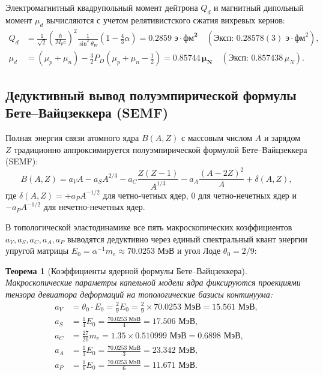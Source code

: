 \documentclass[11pt,a4paper]{article}
\newtheorem{theorem}{Теорема}[section]
\theoremstyle{definition}
\theoremstyle{remark}
\begin{document}
Электромагнитный квадрупольный момент дейтрона $Q_d$ и магнитный дипольный момент $\mu_d$ вычисляются с учетом релятивистского сжатия вихревых кернов:
\begin{align}
    Q_d &= \frac{1}{\sqrt{2}} \left( \frac{\hbar}{M_p c} \right)^2 \frac{1}{\sin^2\theta_W} \left( 1 - \frac{4}{3}\alpha \right) = \mathbf{0.2859\text{ э}\cdot\text{фм}^2} \quad (\text{Эксп: } 0.28578(3)\text{ э}\cdot\text{фм}^2), \\
    \mu_d &= (\mu_p + \mu_n) - \frac{3}{2} P_D \left( \mu_p + \mu_n - \frac{1}{2} \right) = \mathbf{0.85744\,\mu_N} \quad (\text{Эксп: } 0.857438\,\mu_N).
\end{align}

\subsection{Дедуктивный вывод полуэмпирической формулы Бете--Вайцзеккера (SEMF)}
Полная энергия связи атомного ядра $B(A, Z)$ с массовым числом $A$ и зарядом $Z$ традиционно аппроксимируется полуэмпирической формулой Бете--Вайцзеккера (SEMF):
\begin{equation}
    B(A, Z) = a_V A - a_S A^{2/3} - a_C \frac{Z(Z-1)}{A^{1/3}} - a_A \frac{(A - 2Z)^2}{A} + \delta(A, Z),
    \label{eq:weizsaecker_formula}
\end{equation}
где $\delta(A, Z) = +a_P A^{-1/2}$ для четно-четных ядер, $0$ для четно-нечетных ядер и $-a_P A^{-1/2}$ для нечетно-нечетных ядер.

В топологической эластодинамике все пять макроскопических коэффициентов $a_V, a_S, a_C, a_A, a_P$ выводятся дедуктивно через единый спектральный квант энергии упругой матрицы $E_0 = \alpha^{-1} m_e \approx 70.0253\text{ МэВ}$ и угол Лоде $\theta_0 = 2/9$:

\begin{theorem}[Коэффициенты ядерной формулы Бете--Вайцзеккера]
Макроскопические параметры капельной модели ядра фиксируются проекциями тензора девиатора деформаций на топологические базисы континуума:
\begin{align}
    a_V &= \theta_0 \cdot E_0 = \frac{2}{9} E_0 = \frac{2}{9} \times 70.0253\text{ МэВ} = \mathbf{15.561\text{ МэВ}}, \label{eq:av_exact} \\
    a_S &= \frac{1}{4} E_0 = \frac{70.0253\text{ МэВ}}{4} = \mathbf{17.506\text{ МэВ}}, \label{eq:as_exact} \\
    a_C &= \frac{27}{20} m_e = 1.35 \times 0.510999\text{ МэВ} = \mathbf{0.6898\text{ МэВ}}, \label{eq:ac_exact} \\
    a_A &= \frac{1}{3} E_0 = \frac{70.0253\text{ МэВ}}{3} = \mathbf{23.342\text{ МэВ}}, \label{eq:aa_exact} \\
    a_P &= \frac{1}{6} E_0 = \frac{70.0253\text{ МэВ}}{6} = \mathbf{11.671\text{ МэВ}}. \label{eq:ap_exact}
\end{align}
\end{theorem}
\end{document}
